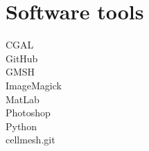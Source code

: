 \documentclass[a4paper,10pt]{article}
\begin{document}
\section{Software tools}
CGAL \\
GitHub \\
GMSH \\
ImageMagick \\
MatLab \\
Photoshop \\
Python \\

cellmesh.git\\
\end{document}
